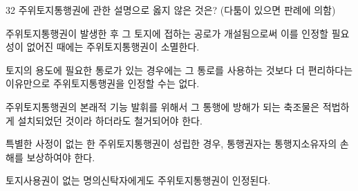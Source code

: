 \begin{question}{32}
주위토지통행권에 관한 설명으로 옳지 않은 것은? (다툼이 있으면 판례에 의함)
\begin{choices}
  \item 주위토지통행권이 발생한 후 그 토지에 접하는 공로가 개설됨으로써 이를 인정할 필요성이 없어진 때에는 주위토지통행권이 소멸한다.
  \item 토지의 용도에 필요한 통로가 있는 경우에는 그 통로를 사용하는 것보다 더 편리하다는 이유만으로 주위토지통행권을 인정할 수는 없다.
  \item 주위토지통행권의 본래적 기능 발휘를 위해서 그 통행에 방해가 되는 축조물은 적법하게 설치되었던 것이라 하더라도 철거되어야 한다.
  \item 특별한 사정이 없는 한 주위토지통행권이 성립한 경우, 통행권자는 통행지소유자의 손해를 보상하여야 한다.
  \item 토지사용권이 없는 명의신탁자에게도 주위토지통행권이 인정된다.
\end{choices}
\end{question}
